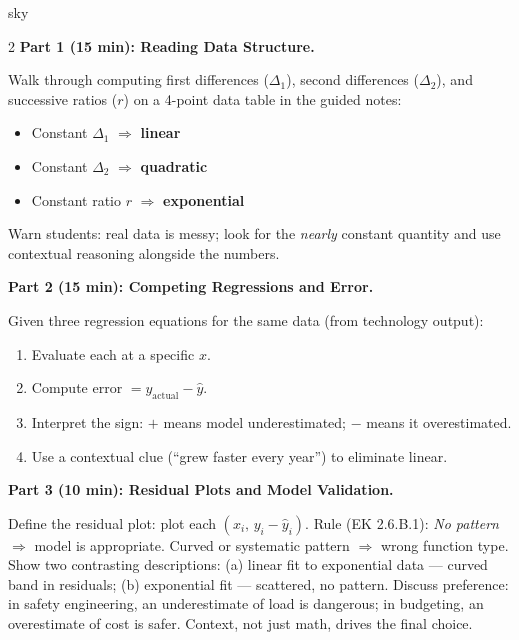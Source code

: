 \documentclass[10pt]{article}
\begin{document}
\begin{skillbox}[Lesson]{sky}
\begin{multicols}{2}
\textbf{Part 1 (15 min): Reading Data Structure.}

Walk through computing first differences ($\Delta_1$), second differences ($\Delta_2$),
and successive ratios ($r$) on a 4-point data table in the guided notes:
\begin{itemize}[itemsep=2pt,topsep=2pt]
  \item Constant $\Delta_1$ $\Rightarrow$ \textbf{linear}
  \item Constant $\Delta_2$ $\Rightarrow$ \textbf{quadratic}
  \item Constant ratio $r$ $\Rightarrow$ \textbf{exponential}
\end{itemize}
Warn students: real data is messy; look for the \emph{nearly} constant quantity and use
contextual reasoning alongside the numbers.

\columnbreak

\textbf{Part 2 (15 min): Competing Regressions and Error.}

Given three regression equations for the same data (from technology output):
\begin{enumerate}[leftmargin=1.4em,itemsep=3pt,topsep=3pt]
  \item Evaluate each at a specific $x$.
  \item Compute error $= y_{\text{actual}} - \hat{y}$.
  \item Interpret the sign: $+$ means model underestimated; $-$ means it overestimated.
  \item Use a contextual clue (``grew faster every year'') to eliminate linear.
\end{enumerate}
\end{multicols}

\medskip
\textbf{Part 3 (10 min): Residual Plots and Model Validation.}

Define the residual plot: plot each $(x_i,\, y_i - \hat{y}_i)$.
Rule (EK 2.6.B.1): \emph{No pattern} $\Rightarrow$ model is appropriate.
Curved or systematic pattern $\Rightarrow$ wrong function type.
Show two contrasting descriptions: (a) linear fit to exponential data --- curved band in
residuals; (b) exponential fit --- scattered, no pattern.
Discuss preference: in safety engineering, an underestimate of load is dangerous; in budgeting,
an overestimate of cost is safer. Context, not just math, drives the final choice.
\end{skillbox}
\end{document}
